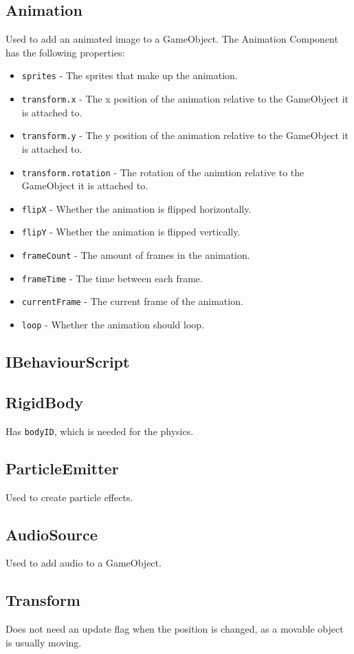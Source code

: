 \subsection{Animation}
Used to add an animated image to a GameObject.
The Animation Component has the following properties:
\begin{itemize}
    \item \texttt{sprites} - The sprites that make up the animation.
    \item \texttt{transform.x} - The x position of the animation relative to the GameObject it is attached to.
    \item \texttt{transform.y} - The y position of the animation relative to the GameObject it is attached to.
    \item \texttt{transform.rotation} - The rotation of the animtion relative to the GameObject it is attached to.
    \item \texttt{flipX} - Whether the animation is flipped horizontally.
    \item \texttt{flipY} - Whether the animation is flipped vertically.
    \item \texttt{frameCount} - The amount of frames in the animation.
    \item \texttt{frameTime} - The time between each frame.
    \item \texttt{currentFrame} - The current frame of the animation.
    \item \texttt{loop} - Whether the animation should loop.
\end{itemize}
\subsection{IBehaviourScript}

\subsection{RigidBody}
Has \texttt{bodyID}, which is needed for the physics.

\subsection{ParticleEmitter}
Used to create particle effects.

\subsection{AudioSource}
Used to add audio to a GameObject.

\subsection{Transform}
Does not need an update flag when the position is changed, as a movable object is usually moving.


